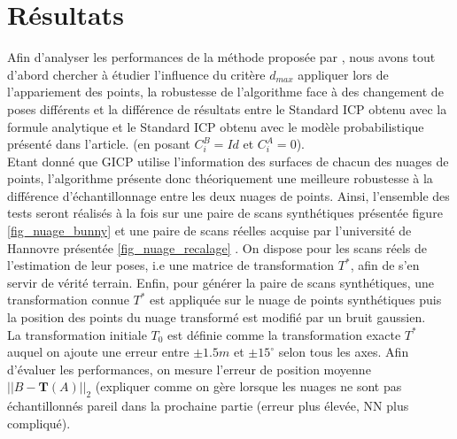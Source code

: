 \section{Résultats}
Afin d'analyser les performances de la méthode proposée par \cite{bib_gicp}, nous avons tout d'abord chercher à étudier l'influence du critère $d_{max}$ appliquer lors de l'appariement des points, la robustesse de l'algorithme face à des changement de poses différents et la différence de résultats entre le Standard ICP obtenu avec la formule analytique et le Standard ICP obtenu avec le modèle probabilistique présenté dans l'article. (en posant $C_{i}^B=Id$ et $C_{i}^A=0$).\\

Etant donné que GICP utilise l'information des surfaces de chacun des nuages de points, l'algorithme présente donc théoriquement une meilleure robustesse à la différence d'échantillonnage entre les deux nuages de points. Ainsi, l'ensemble des tests seront réalisés à la fois sur une paire de scans synthétiques présentée figure \ref{fig_nuage_bunny} et une paire de scans réelles acquise par l'université de Hannovre présentée \ref{fig_nuage_recalage} . On dispose pour les scans réels de l'estimation de leur poses, i.e une matrice de transformation $T^*$, afin de s'en servir de vérité terrain. Enfin, pour générer la paire de scans synthétiques, une transformation connue $T^{*}$ est appliquée sur le nuage de points synthétiques puis la position des points du nuage transformé est modifié par un bruit gaussien.\\

La transformation initiale $T_0$ est définie comme la transformation exacte $T^*$ auquel on ajoute une erreur entre $\pm1.5m$ et $\pm15^{\circ}$ selon tous les axes. Afin d'évaluer les performances, on mesure l'erreur de position moyenne $||B - \mathbf{T}(A)||_2$ (expliquer comme on gère lorsque les nuages ne sont pas échantillonnés pareil dans la prochaine partie (erreur plus élevée, NN plus compliqué). 
